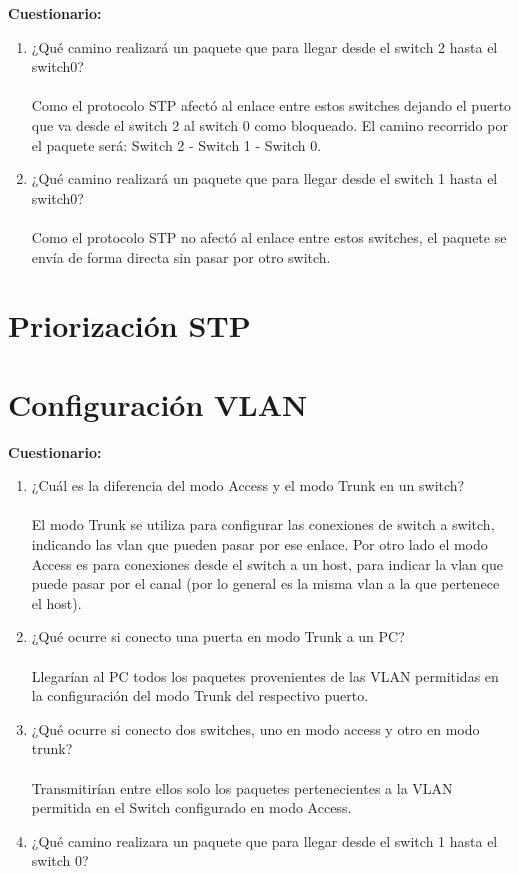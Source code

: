 \documentclass{udpreport}
\begin{document}
	{\large \bf{Cuestionario: }}\\
	\begin{enumerate}
	    \item ¿Qué camino realizará un paquete que para llegar desde el switch
2 hasta el switch0?\\\\
        Como el protocolo STP afectó al enlace entre estos switches dejando el puerto que va desde el switch 2 al switch 0 como
        bloqueado. El camino recorrido por el paquete será: Switch 2 - Switch 1 - Switch 0. 
        \item  ¿Qué camino realizará un paquete que para llegar desde el switch
1 hasta el switch0?\\\\
          Como el protocolo STP no afectó al enlace entre estos switches, el paquete se envía de forma directa sin pasar por otro
          switch.
	\end{enumerate}
	\section{Priorización STP}
	
	\section{Configuración VLAN}
	
	{\large \bf{Cuestionario: }}\\
	\begin{enumerate}
	    \item ¿Cuál es la diferencia del modo Access y el modo Trunk en un switch?\\\\
	         El modo Trunk se utiliza para configurar las conexiones de switch a switch, indicando las vlan que pueden pasar por
	         ese enlace. Por otro lado el modo Access es para conexiones desde el switch a un host, para indicar la vlan que puede
	         pasar por el canal (por lo general es la misma vlan a la que pertenece el host).
        \item  ¿Qué ocurre si conecto una puerta en modo Trunk a un PC?\\\\
            Llegarían al PC todos los paquetes provenientes de las VLAN permitidas en la configuración del modo Trunk del respectivo
            puerto.
        \item ¿Qué ocurre si conecto dos switches, uno en modo access y otro en modo trunk?\\\\
              Transmitirían entre ellos solo los paquetes pertenecientes a la VLAN 
  	      permitida en el Switch configurado en modo Access.
  	     \item  ¿Qué camino realizara un paquete que para llegar desde el switch 1 hasta el switch 0?\\\\
  	     
	\end{enumerate}
\end{document}
